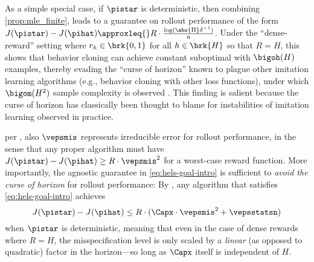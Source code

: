 As a simple special case, if $\pistar$ is deterministic, then
combining \cref{prop:mle_finite}, leads to a guarantee on rollout
performance of the form $J(\pistar) - J(\pihat) \approxleq{}
R\cdot\frac{\log(\abs{\Pi}\delta^{-1})}{n}$. Under the ``dense-reward'' setting where $r_h\in\brk{0,1}$ for all $h\in\brk{H}$
so that $R=H$, this shows that behavior cloning can achieve constant
suboptimal with $\bigoh(H)$ examples, thereby evading the ``curse of
horizon'' known to plague other imitation learning algorithms (e.g.,
behavior cloning with other loss functions), under which $\bigom(H^2)$
sample complexity is observed \citep{ross2010efficient,ross2011reduction,ross2014reinforcement,
  rajaraman2020toward,rajaraman2021value,rajaraman2021provably,swamy2022minimax}. This
finding is salient because the curse of horizon has classically
been thought to blame for instabilities of imitation learning observed
in practice. %

per ,
also $\vepsmis$ represents irreducible error for rollout performance,
in the sense that any proper algorithm must have
$J(\pistar)-J(\pihat)\geq{}R\cdot\vepsmis^2$ for a worst-case reward
function. More importantly, the agnostic guarantee in
\cref{eq:hels-goal-intro} is sufficient to \emph{avoid the curse of
  horizon} for rollout performance: By , any algorithm that
satisfies \cref{eq:hels-goal-intro} achieves %
\[
  J(\pistar)-J(\pihat) \leq R\cdot{}(\Capx\cdot\vepsmis^2 + \vepsstatsn)
\]
when $\pistar$ is deterministic, meaning that even in the case of
dense rewards where $R=H$, the misspecification level is only scaled
by a \emph{linear} (as opposed to quadratic) factor in the horizon---so long as $\Capx$ itself is
independent of $H$.
